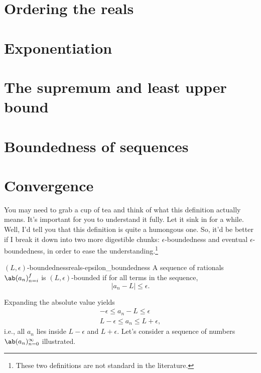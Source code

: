 \section{Ordering the reals}

\section{Exponentiation}

\section{The supremum and least upper bound}

\section{Boundedness of sequences}

\section{Convergence}

You may need to grab a cup of tea and think of what this definition actually means. It's
important for you to understand it fully. Let it sink in for a while. Well, I'd tell you
that this definition is quite a humongous one. So, it'd be better if I break it down into
two more digestible chunks: $\epsilon$-boundedness and eventual $\epsilon$-boundedness, in
order to ease the understanding.\footnote{These two definitions are not standard in the literature.}

\begin{df}{$(L, \epsilon)$-boundedness}{reals-epsilon_boundedness}
  A sequence of rationals $\sequence{a_n}{n = i}{f}$ is $(L, \epsilon)$-bounded if for
  all terms in the sequence,
  \begin{equation*}
    |a_n - L| \leq \epsilon.
  \end{equation*}
\end{df}

Expanding the absolute value yields
\begin{gather}
  - \epsilon \leq a_n - L \leq \epsilon    \\
  L - \epsilon \leq a_n \leq L + \epsilon,
\end{gather}
i.e., all $a_n$ lies inside $L - \epsilon$ and $L + \epsilon$. Let's consider a sequence
of numbers $\sequence{a_n}{n = 0}{\infty}$ illustrated.


